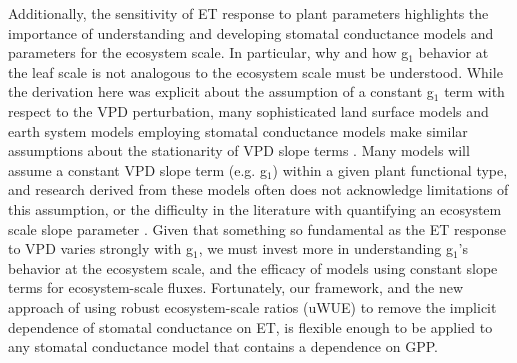 Additionally, the sensitivity of ET response to plant parameters
highlights the importance of understanding and developing stomatal
conductance models and parameters for the ecosystem scale. In
particular, why and how g$_1$ behavior at the leaf scale is not
analogous to the ecosystem scale must be understood. While the
derivation here was explicit about the assumption of a constant g$_1$
term with respect to the VPD perturbation, many sophisticated land
surface models and earth system models employing stomatal conductance
models make similar assumptions about the stationarity of VPD slope
terms \cite{Niu_2011, Franks_2017, Rogers_2017, Lawrence_2019}. Many
models will assume a constant VPD slope term (e.g. g$_1$) within
a given plant functional type, and research derived from these models
often does not acknowledge limitations of this assumption, or the
difficulty in the literature with quantifying an ecosystem scale slope
parameter \cite{Medlyn_2017}. Given that something so fundamental as
the ET response to VPD varies strongly with g$_1$, we must invest more
in understanding g$_1$'s behavior at the ecosystem scale, and the
efficacy of models using constant slope terms for ecosystem-scale
fluxes. Fortunately, our framework, and the new approach of using
robust ecosystem-scale ratios (uWUE) to remove the implicit dependence
of stomatal conductance on ET, is flexible enough to be applied to any
stomatal conductance model that contains a dependence on GPP.

